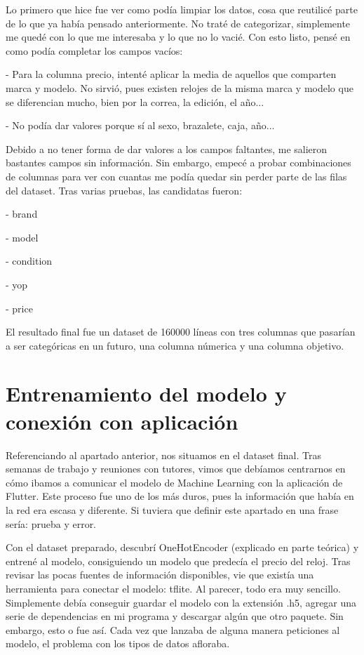 		Lo primero que hice fue ver como podía limpiar los datos, cosa que reutilicé parte de lo que ya había pensado anteriormente. No traté de categorizar, simplemente me quedé con lo que me interesaba y lo que no lo vacié. Con esto listo, pensé en como podía completar los campos vacíos: 
		\begin{description}
		\item - Para la columna precio, intenté aplicar la media de aquellos que comparten marca y modelo. No sirvió, pues existen relojes de la misma marca y modelo que se diferencian mucho, bien por la correa, la edición, el año...
		\item - No podía dar valores porque sí al sexo, brazalete, caja, año...
	\end{description}
	Debido a no tener forma de dar valores a los campos faltantes, me salieron bastantes campos sin información. Sin embargo, empecé a probar combinaciones de columnas para ver con cuantas me podía quedar sin perder parte de las filas del dataset. Tras varias pruebas, las candidatas fueron:
		\begin{description}
		\item - brand
		\item - model
		\item - condition
		\item - yop
		\item - price
	\end{description}
	
	El resultado final fue un dataset de 160000 líneas con tres columnas que pasarían a ser categóricas en un futuro, una columna númerica y una columna objetivo.
	
		
\section{Entrenamiento del modelo y conexión con aplicación}

	Referenciando al apartado anterior, nos situamos en el dataset final. Tras semanas de trabajo y reuniones con tutores, vimos que debíamos centrarnos en cómo ibamos a comunicar el modelo de Machine Learning con la aplicación de Flutter. Este proceso fue uno de los más duros, pues la información que había en la red era escasa y diferente. Si tuviera que definir este apartado en una frase sería: prueba y error.
	
	Con el dataset preparado, descubrí OneHotEncoder (explicado en parte teórica) y entrené al modelo, consiguiendo un modelo que predecía el precio del reloj. Tras revisar las pocas fuentes de información disponibles, vie que existía una herramienta para conectar el modelo: tflite. Al parecer, todo era muy sencillo. Simplemente debía conseguir guardar el modelo con la extensión .h5, agregar una serie de dependencias en mi programa y descargar algún que otro paquete. Sin embargo, esto o fue así. Cada vez que lanzaba de alguna manera peticiones al modelo, el problema con los tipos de datos afloraba.
	
